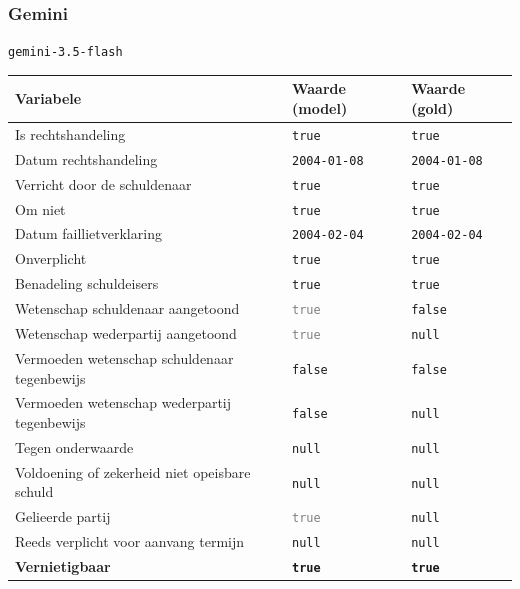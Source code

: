 \documentclass[
  dutch,
  a4paper,
]{article}
\begin{document}
\newpage


\subsubsection{Gemini}\label{gemini-15}

\texttt{gemini-3.5-flash}

\begin{center}
\small
\begin{tabular}{@{}p{7.4cm}p{2.6cm}p{2.6cm}@{}}
\toprule
Variabele & Waarde (model) & Waarde (gold) \\
\midrule
Is rechtshandeling & \texttt{true} & \texttt{true} \\
Datum rechtshandeling & \texttt{2004-01-08} & \texttt{2004-01-08} \\
Verricht door de schuldenaar & \texttt{true} & \texttt{true} \\
Om niet & \texttt{true} & \texttt{true} \\
Datum faillietverklaring & \texttt{2004-02-04} & \texttt{2004-02-04} \\
Onverplicht & \texttt{true} & \texttt{true} \\
Benadeling schuldeisers & \texttt{true} & \texttt{true} \\
Wetenschap schuldenaar aangetoond & \textcolor{gray}{\texttt{true}} & \texttt{false} \\
Wetenschap wederpartij aangetoond & \textcolor{gray}{\texttt{true}} & \texttt{null} \\
Vermoeden wetenschap schuldenaar tegenbewijs & \texttt{false} & \texttt{false} \\
Vermoeden wetenschap wederpartij tegenbewijs & \texttt{false} & \texttt{null} \\
Tegen onderwaarde & \texttt{null} & \texttt{null} \\
Voldoening of zekerheid niet opeisbare schuld & \texttt{null} & \texttt{null} \\
Gelieerde partij & \textcolor{gray}{\texttt{true}} & \texttt{null} \\
Reeds verplicht voor aanvang termijn & \texttt{null} & \texttt{null} \\
\textbf{Vernietigbaar} & \textbf{\texttt{true}} & \textbf{\texttt{true}} \\
\bottomrule
\end{tabular}
\end{center}
\end{document}
